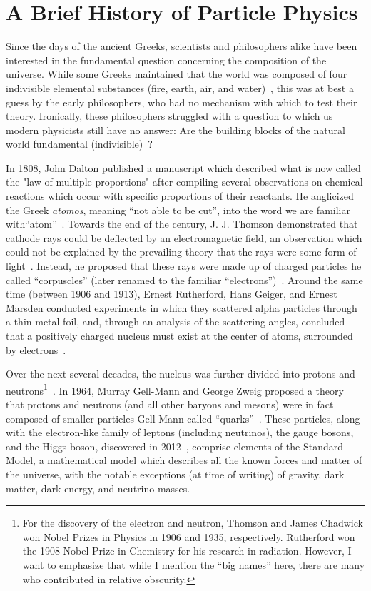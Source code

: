 \section{A Brief History of Particle Physics}\label{sec:a_brief_history_of_particle_physics}

Since the days of the ancient Greeks, scientists and philosophers alike have been interested in the fundamental question concerning the composition of the universe. While some Greeks maintained that the world was composed of four indivisible elemental substances (fire, earth, air, and water)~\cite{Ross1925}, this was at best a guess by the early philosophers, who had no mechanism with which to test their theory. Ironically, these philosophers struggled with a question to which us modern physicists still have no answer: Are the building blocks of the natural world fundamental (indivisible)~\cite{Hardie1984}?

In 1808, John Dalton published a manuscript which described what is now called the "law of multiple proportions" after compiling several observations on chemical reactions which occur with specific proportions of their reactants. He anglicized the Greek \textit{atomos}, meaning ``not able to be cut'', into the word we are familiar with\textemdash ``atom''~\cite{Dalton1808}. Towards the end of the century, J. J. Thomson demonstrated that cathode rays could be deflected by an electromagnetic field, an observation which could not be explained by the prevailing theory that the rays were some form of light~\cite{Thomson1897}. Instead, he proposed that these rays were made up of charged particles he called ``corpuscles'' (later renamed to the familiar ``electrons'')~\cite{Thomson1907}. Around the same time (between 1906 and 1913), Ernest Rutherford, Hans Geiger, and Ernest Marsden conducted experiments in which they scattered alpha particles through a thin metal foil, and, through an analysis of the scattering angles, concluded that a positively charged nucleus must exist at the center of atoms, surrounded by electrons~\cite{Rutherford1911}.

Over the next several decades, the nucleus was further divided into protons and neutrons\footnote{For the discovery of the electron and neutron, Thomson and James Chadwick won Nobel Prizes in Physics in 1906 and 1935, respectively. Rutherford won the 1908 Nobel Prize in Chemistry for his research in radiation. However, I want to emphasize that while I mention the ``big names'' here, there are many who contributed in relative obscurity.}~\cite{Masson1921,Chadwick1932}. In 1964, Murray Gell-Mann and George Zweig proposed a theory that protons and neutrons (and all other baryons and mesons) were in fact composed of smaller particles Gell-Mann called ``quarks''~\cite{Gell-Mann1964}. These particles, along with the electron-like family of leptons (including neutrinos), the gauge bosons, and the Higgs boson, discovered in 2012~\cite{Aad2012}, comprise elements of the Standard Model, a mathematical model which describes all the known forces and matter of the universe, with the notable exceptions (at time of writing) of gravity, dark matter, dark energy, and neutrino masses.

